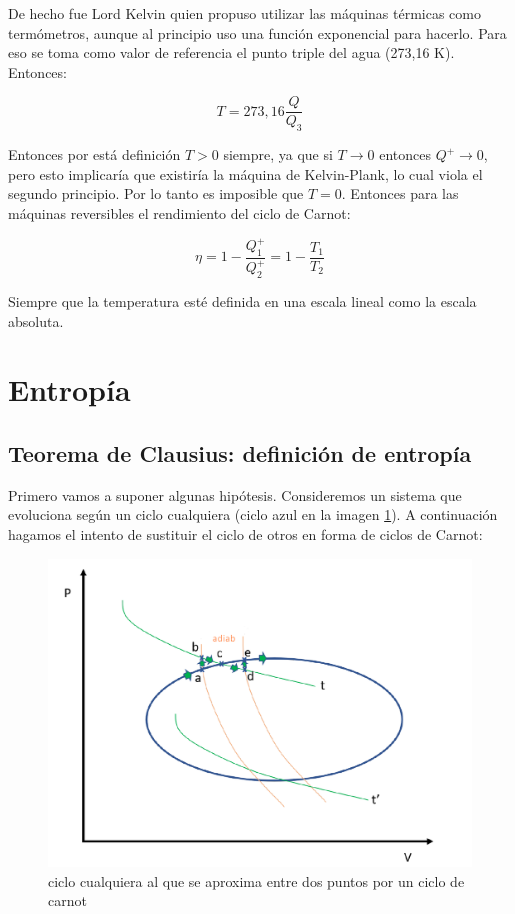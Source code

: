 \documentclass[12pt,a4paper]{article}
\begin{document}
De hecho fue Lord Kelvin quien propuso utilizar las máquinas térmicas como termómetros, aunque al principio uso una función exponencial para hacerlo. Para eso se toma como valor de referencia el punto triple del agua (273,16 K). Entonces:

\begin{equation}
T = 273,16 \dfrac{Q}{Q_3}
\end{equation} 

Entonces por está definición $T>0$ siempre, ya que si $T \rightarrow 0$ entonces $Q^+ \rightarrow 0$, pero esto implicaría que existiría la máquina de Kelvin-Plank, lo cual viola el segundo principio. Por lo tanto es imposible que $T=0$. Entonces para las máquinas reversibles el rendimiento del ciclo de Carnot:

$$ \eta = 1 - \dfrac{Q_1^+}{Q_2^+} = 1 - \frac{T_1}{T_2}$$

Siempre que la temperatura esté definida en una escala lineal como la escala absoluta. 

\newpage

\section{Entropía}
\subsection{Teorema de Clausius: definición de entropía}


Primero vamos a suponer algunas hipótesis. Consideremos un sistema que evoluciona según un ciclo cualquiera (ciclo azul en la imagen \ref{fig:5-1}). A continuación hagamos el intento de sustituir el ciclo de otros en forma de ciclos de Carnot:

\begin{figure}[h!] \centering
\includegraphics[scale=0.5]{teorema-clausius-1.png}
\caption{ciclo cualquiera al que se aproxima entre dos puntos por un ciclo de carnot}
\label{fig:5-1}
\end{figure}
\end{document}
